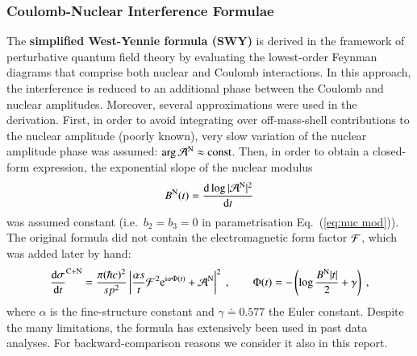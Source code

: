\subsubsection{Coulomb-Nuclear Interference Formulae}
\label{sec:cni interference}

The {\bf simplified West-Yennie formula (SWY)} \cite{wy68} is derived in the framework of perturbative quantum field theory by evaluating the lowest-order Feynman diagrams that comprise both nuclear and Coulomb interactions. In this approach, the interference is reduced to an additional phase between the Coulomb and nuclear amplitudes. Moreover, several approximations were used in the derivation. First, in order to avoid integrating over off-mass-shell contributions to the nuclear amplitude (poorly known), very slow variation of the nuclear amplitude phase was assumed: $\arg {\cal A}^{\rm N} \approx \hbox{const}$. Then, in order to obtain a closed-form expression, the exponential slope of the nuclear modulus
\begin{equation}
\label{eq:nuc slope}
B^{\rm N}(t) = {\d \log |{\cal A}^{\rm N}|^2 \over \d t}
\end{equation}
was assumed constant (i.e.~$b_2 = b_3 = 0$ in parametrisation Eq.~(\ref{eq:nuc mod})). The original formula did not contain the electromagnetic form factor ${\cal F}$, which was added later by hand:
\begin{equation}
\label{eq:int swy}
	{\d\sigma\over \d t}^{\rm C+N} = {\pi (\hbar c)^2 \over s p^2} \left | {\alpha s\over t} {\cal F}^2 \e^{\I\alpha \Phi(t)} + {\cal A}^{\rm N} \right |^2\ ,\qquad
	\Phi(t) = - \left( \log {B^{\rm N} |t|\over 2} + \gamma \right)\ ,
\end{equation}
where $\alpha$ is the fine-structure constant and $\gamma \doteq 0.577$ the Euler constant. Despite the many limitations, the formula has extensively been used in past data analyses. For backward-comparison reasons we consider it also in this report.


